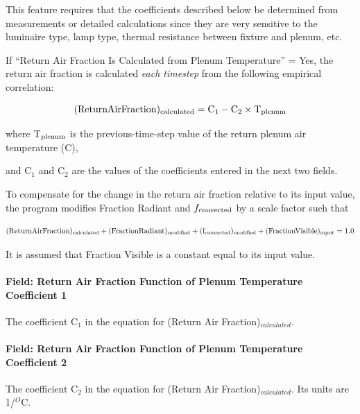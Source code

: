 This feature requires that the coefficients described below be determined from measurements or detailed calculations since they are very sensitive to the luminaire type, lamp type, thermal resistance between fixture and plenum, etc.

If ``Return Air Fraction Is Calculated from Plenum Temperature'' = Yes, the return air fraction is calculated \emph{each timestep} from the following empirical correlation:

\begin{equation}
  (\rm{Return Air Fraction})_{\rm{calculated}} = C_{1} - C_{2} \times T_{\rm{plenum}}
\end{equation}

where T\(_{\rm{plenum}}\) is the previous-time-step value of the return plenum air temperature (C),

and C\(_{1}\) and C\(_{2}\) are the values of the coefficients entered in the next two fields.

To compensate for the change in the return air fraction relative to its input value, the program modifies Fraction Radiant and \(f_{\rm{convected}}\) by a scale factor such that

\begin{equation}
  (\rm{Return Air Fraction})_{\rm{calculated}} + (\rm{Fraction Radiant})_{\rm{modified}} + (f_{\rm{convected}})_{\rm{modified}} + (\rm{Fraction Visible})_{\rm{input}} = 1.0
\end{equation}

It is assumed that Fraction Visible is a constant equal to its input value.

\paragraph{Field: Return Air Fraction Function of Plenum Temperature Coefficient 1}\label{field-return-air-fraction-function-of-plenum-temperature-coefficient-1}

The coefficient C\(_{1}\) in the equation for (Return Air Fraction)\(_{calculated}\).

\paragraph{Field: Return Air Fraction Function of Plenum Temperature Coefficient 2}\label{field-return-air-fraction-function-of-plenum-temperature-coefficient-2}

The coefficient C\(_{2}\) in the equation for (Return Air Fraction)\(_{calculated}\). Its units are 1/\(^{O}\)C.

